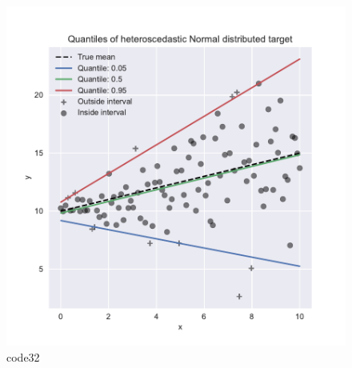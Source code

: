 \begin{figure}[htbp]
	\centering
	\includegraphics[width=14cm]{codeimage/code32}
	\caption{code32}
	\label{code32}
\end{figure}
